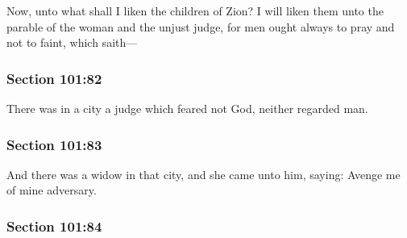 		Now, unto what shall I liken the children of Zion?  I will liken them unto the parable of the woman and the unjust judge, for men ought always to pray and not to faint, which saith---


	\subsubsection{Section 101:82} %
		\label{DC101-82}

		There was in a city a judge which feared not God, neither regarded man.


	\subsubsection{Section 101:83} %
		\label{DC101-83}

		And there was a widow in that city, and she came unto him, saying: Avenge me of mine adversary.


	\subsubsection{Section 101:84} %
		\label{DC101-84}

